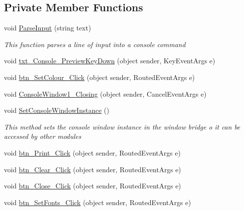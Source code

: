 \subsection*{Private Member Functions}
\begin{DoxyCompactItemize}
\item 
void \hyperlink{class_c_p_u___o_s___simulator_1_1_console_window_a0a66aa7f0e333cc919589a7ce4d584c0}{Parse\+Input} (string text)
\begin{DoxyCompactList}\small\item\em This function parses a line of input into a console command \end{DoxyCompactList}\item 
void \hyperlink{class_c_p_u___o_s___simulator_1_1_console_window_aabd331e8c3a83c87ccd2e09c3959408d}{txt\+\_\+\+Console\+\_\+\+Preview\+Key\+Down} (object sender, Key\+Event\+Args e)
\item 
void \hyperlink{class_c_p_u___o_s___simulator_1_1_console_window_a1de6be8bb7f4f581a9e4131a0408e632}{btn\+\_\+\+Set\+Colour\+\_\+\+Click} (object sender, Routed\+Event\+Args e)
\item 
void \hyperlink{class_c_p_u___o_s___simulator_1_1_console_window_a6b842220939aa42076c6770d646e2cc3}{Console\+Window1\+\_\+\+Closing} (object sender, Cancel\+Event\+Args e)
\item 
void \hyperlink{class_c_p_u___o_s___simulator_1_1_console_window_a8719d25b2617a32a78511d9e584d90a0}{Set\+Console\+Window\+Instance} ()
\begin{DoxyCompactList}\small\item\em This method sets the console window instance in the window bridge o it can be accessed by other modules \end{DoxyCompactList}\item 
void \hyperlink{class_c_p_u___o_s___simulator_1_1_console_window_ae362d36774ccfa84e775d6460e938a47}{btn\+\_\+\+Print\+\_\+\+Click} (object sender, Routed\+Event\+Args e)
\item 
void \hyperlink{class_c_p_u___o_s___simulator_1_1_console_window_a5bdaca75d834561bcf3e8ebef9f74926}{btn\+\_\+\+Clear\+\_\+\+Click} (object sender, Routed\+Event\+Args e)
\item 
void \hyperlink{class_c_p_u___o_s___simulator_1_1_console_window_ac971a3a0719009235a1dc369f6436df1}{btn\+\_\+\+Close\+\_\+\+Click} (object sender, Routed\+Event\+Args e)
\item 
void \hyperlink{class_c_p_u___o_s___simulator_1_1_console_window_a9b4298ff51320694cef9d160759700a3}{btn\+\_\+\+Set\+Fonts\+\_\+\+Click} (object sender, Routed\+Event\+Args e)
\end{DoxyCompactItemize}
